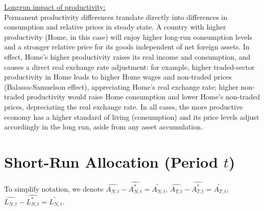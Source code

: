 \documentclass[a4paper,12pt]{article} %
\theoremstyle{nonitalic}
\begin{document}
\underline{Longrun impact of productivity:} \\
Permanent productivity differences translate directly into differences in consumption and relative prices in steady state. 
A country with higher productivity (Home, in this case) 
will enjoy higher long-run consumption levels and a stronger relative price for its goods independent of net foreign assets.
In effect, Home's higher productivity raises its real income and consumption, 
and causes a direct real exchange rate adjustment: 
for example, higher traded-sector productivity in Home leads to higher Home wages and non-traded prices 
(Balassa-Samuelson effect), 
appreciating Home's real exchange rate; 
higher non-traded productivity would raise Home consumption and lower Home's non-traded prices, 
depreciating the real exchange rate. 
In all cases, the more productive economy has a higher standard of living 
(consumption) and its price levels adjust accordingly in the long run, 
aside from any asset accumulation.

\section{Short-Run Allocation (Period $t$)}
To simplify notation, we denote $ \widehat{A_{N,t}} - \widehat{A_{N,t}^*}  = \widetilde{A_{N,t}}$, $ \widehat{A_{T,t}} - \widehat{A_{T,t}^*}  = \widetilde{A_{T,t}}$, $ \widehat{L_{N,t}} - \widehat{L_{N,t}^*}  = \widetilde{L_{N,t}}$. 
\end{document}
